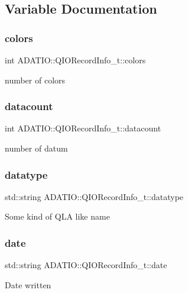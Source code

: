 \subsection{Variable Documentation}
\mbox{\label{group__qio_gad7bee26b17d771036f2b87c847328b24}} 
\subsubsection{\texorpdfstring{colors}{colors}}
{\footnotesize\ttfamily int A\+D\+A\+T\+I\+O\+::\+Q\+I\+O\+Record\+Info\+\_\+t\+::colors}

number of colors \mbox{\label{group__qio_ga8051a480bb96231cfa758ddfab5ed415}} 
\subsubsection{\texorpdfstring{datacount}{datacount}}
{\footnotesize\ttfamily int A\+D\+A\+T\+I\+O\+::\+Q\+I\+O\+Record\+Info\+\_\+t\+::datacount}

number of datum \mbox{\label{group__qio_ga62e8335fcf5ac25dc36eaeee8519ee64}} 
\subsubsection{\texorpdfstring{datatype}{datatype}}
{\footnotesize\ttfamily std\+::string A\+D\+A\+T\+I\+O\+::\+Q\+I\+O\+Record\+Info\+\_\+t\+::datatype}

Some kind of Q\+LA like name \mbox{\label{group__qio_ga1894a21fc67312581fac55295c8941e6}} 
\subsubsection{\texorpdfstring{date}{date}}
{\footnotesize\ttfamily std\+::string A\+D\+A\+T\+I\+O\+::\+Q\+I\+O\+Record\+Info\+\_\+t\+::date}

Date written \mbox{\label{group__qio_ga5aa39f1711aa7f6ae4a7b8d73d7e3f97}} 
